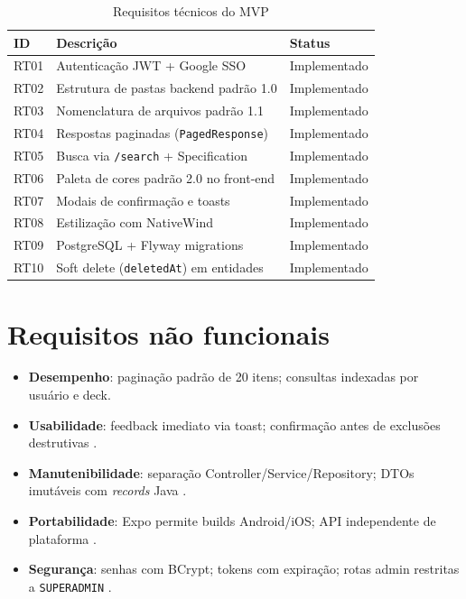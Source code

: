 \begin{longtable}{p{1.2cm} p{8cm} p{3.3cm}}
    \caption{Requisitos técnicos do MVP} \label{tab:rf-tecnicos} \\
    \toprule
    \textbf{ID} & \textbf{Descrição} & \textbf{Status} \\
    \midrule
    \endfirsthead
    RT01 & Autenticação JWT + Google SSO & Implementado \\
    RT02 & Estrutura de pastas backend padrão 1.0 & Implementado \\
    RT03 & Nomenclatura de arquivos padrão 1.1 & Implementado \\
    RT04 & Respostas paginadas (\texttt{PagedResponse}) & Implementado \\
    RT05 & Busca via \texttt{/search} + Specification & Implementado \\
    RT06 & Paleta de cores padrão 2.0 no front-end & Implementado \\
    RT07 & Modais de confirmação e toasts & Implementado \\
    RT08 & Estilização com NativeWind & Implementado \\
    RT09 & PostgreSQL + Flyway migrations & Implementado \\
    RT10 & Soft delete (\texttt{deletedAt}) em entidades & Implementado \\
    \bottomrule
\end{longtable}

\section{Requisitos não funcionais}

\begin{itemize}
    \item \textbf{Desempenho}: paginação padrão de 20 itens; consultas indexadas por usuário e deck.
    \item \textbf{Usabilidade}: feedback imediato via toast; confirmação antes de exclusões destrutivas \cite{mobile_first_nielsen}.
    \item \textbf{Manutenibilidade}: separação Controller/Service/Repository; DTOs imutáveis com \textit{records} Java \cite{java_records_spring}.
    \item \textbf{Portabilidade}: Expo permite builds Android/iOS; API independente de plataforma \cite{expo_eas_build}.
    \item \textbf{Segurança}: senhas com BCrypt; tokens com expiração; rotas admin restritas a \texttt{SUPERADMIN} \cite{bcrypt_spring,owasp_mobile}.
\end{itemize}


